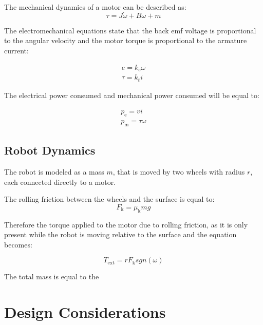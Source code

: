 \noindent
The mechanical dynamics of a motor can be described as:
\begin{equation}
\tau = J\dot{\omega} + B\omega + m
\end{equation}

\noindent
The electromechanical equations state that the back emf voltage is proportional to the angular velocity and the motor torque is proportional to the armature current:

\begin{equation}
    \begin{gathered}
		e = k_{e} \omega \\
		\tau = k_{t} i
    \end{gathered}
\end{equation}

\noindent
The electrical power consumed and mechanical power consumed will be equal to:

\begin{equation}
	\begin{gathered}
		p_{\text{e}} = vi \\
		p_{\text{m}} = \tau\omega
	\end{gathered}
\end{equation}
	

\subsection{Robot Dynamics}
The robot is modeled as a mass $m$, that is moved by two wheels with radius $r$, each connected directly to a motor.


The rolling friction between the wheels and the surface is equal to:
\begin{equation}
	F_{\text{k}} = \mu_{\text{k}}mg
\end{equation}

Therefore the torque applied to the motor due to rolling friction, as it is only present while the robot is moving relative to the surface and the equation becomes:

\begin{equation}
	T_{\text{ext}} = rF_{\text{k}} sgn(\omega)
\end{equation}

\noindent
The total mass is equal to the 

\section{Design Considerations}
\label{sec:design_considerations}

